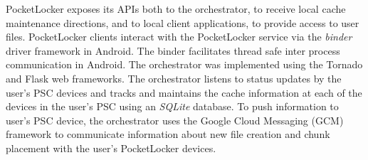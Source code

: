 PocketLocker exposes its APIs both to the orchestrator, to receive local cache
maintenance directions, and to local client applications, to provide access to
user files. PocketLocker clients interact with the PocketLocker service via the
\textit{binder} driver framework in Android. The binder facilitates thread safe
inter process communication in Android. The orchestrator was implemented using
the Tornado and Flask web frameworks. The orchestrator listens to status
updates by the user's PSC devices and tracks and maintains the cache
information at each of the devices in the user's PSC using an \textit{SQLite}
database. To push information to user's PSC device, the orchestrator uses the
Google Cloud Messaging (GCM) framework to communicate information about new
file creation and chunk placement with the user's PocketLocker devices.
